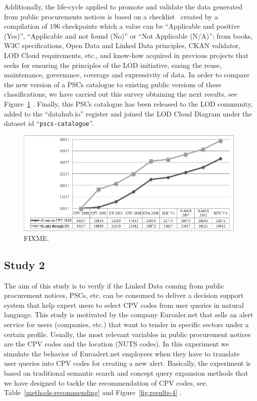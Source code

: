 Additionally, the life-cycle applied to promote and validate the data generated from public procurements notices is based on 
a checklist~\cite{} created by a compilation of $196$ checkpoints which a value can be ``Applicable and positive (Yes)'', ``Applicable and not found (No)'' or ``Not Applicable (N/A)''; 
from books, W3C specifications, Open Data and Linked Data principles, CKAN validator, LOD Cloud requirements, etc., 
and know-how acquired in previous projects that seeks for ensuring the principles of the LOD initiative, 
easing the reuse, maintenance, governance, coverage and expressivity of data. 
In order to compare the new version of a PSCs catalogue to existing public versions of these classifications, 
we have carried out this survey obtaining the next results, see Figure~\ref{fig:results-3} . Finally, this PSCs catalogue has been released to the LOD community, added to the ``datahub.io'' 
register and joined the LOD Cloud Diagram under the dataset id ``\texttt{pscs-catalogue}''.

 
 \begin{figure}[!ht]
\centering
	\includegraphics[width=\textwidth]{./imgs/fig-3}
 \caption{FIXME.}
 \label{fig:results-3}
\end{figure}


\subsection{Study 2}
The aim of this study is to verify if the Linked Data coming from public procurement notices, PSCs, etc. can be consumed to deliver a decision support system that help expert 
users to select CPV codes from user queries in natural language. This study is motivated by the company Euroaler.net that sells an alert service for users (companies, etc.) 
that want to tender in specific sectors under a certain profile. Usually, the most relevant variables in public procurement notices are the CPV codes and the 
location (NUTS codes). In this experiment we simulate the behavior of Euroalert.net employees when they have to translate user queries into CPV codes 
for creating a new alert. Basically, the experiment is based on traditional semantic search and concept query expansion methods that we have designed to 
tackle the recommendation of CPV codes, see. Table~\ref{methods-recommending} and Figure~\ref{fig:results-4} . 


